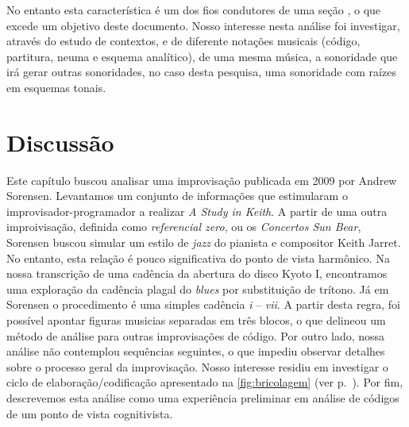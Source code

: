 No entanto esta característica é um dos fios condutores de uma seção , o que excede um objetivo deste documento. Nosso interesse nesta análise foi investigar, através do estudo de contextos, e de diferente notações musicais (código, partitura, neuma e esquema analítico), de uma mesma música, a sonoridade que irá gerar outras sonoridades, no caso desta pesquisa, uma sonoridade com raízes em esquemas tonais.

\section{Discussão}

Este capítulo buscou analisar uma improvisação publicada em 2009 por Andrew Sorensen. Levantamos um conjunto de informações que estimularam o improvisador-programador a realizar \emph{A Study in Keith}. A partir de uma outra improivisação,  definida como \emph{referencial zero}, ou os \emph{Concertos Sun Bear}, Sorensen buscou simular um estilo de \emph{jazz} do pianista e compositor Keith Jarret. No entanto, esta relação é pouco significativa do ponto de vista harmônico. Na nossa transcrição de uma cadência da abertura do disco Kyoto I, encontramos uma exploração da cadência plagal do \emph{blues} por substituição de trítono. Já em Sorensen o procedimento é uma simples cadência \emph{i} -- \emph{vii}. A partir desta regra, foi possível apontar figuras musicias separadas em três blocos, o que delineou um método de análise para outras improvisações de código. Por outro lado, nossa análise não contemplou sequências seguintes, o que impediu observar detalhes sobre o processo geral da improvisação. Nosso interesse residiu em investigar o ciclo de elaboração/codificação apresentado na \autoref{fig:bricolagem} (ver p.~\pageref{fig:bricolagem}). Por fim, descrevemos esta análise como uma experiência preliminar em análise de códigos de um ponto de vista cognitivista. 